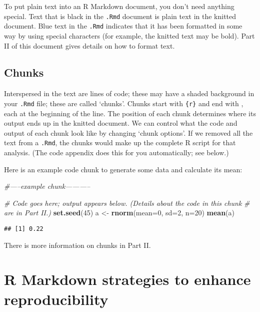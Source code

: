 \documentclass[
]{article}
\newenvironment{Shaded}{\begin{snugshade}}{\end{snugshade}}
\newcommand{\CommentTok}[1]{\textcolor[rgb]{0.56,0.35,0.01}{\textit{#1}}}
\newcommand{\DataTypeTok}[1]{\textcolor[rgb]{0.13,0.29,0.53}{#1}}
\newcommand{\DecValTok}[1]{\textcolor[rgb]{0.00,0.00,0.81}{#1}}
\newcommand{\KeywordTok}[1]{\textcolor[rgb]{0.13,0.29,0.53}{\textbf{#1}}}
\newcommand{\NormalTok}[1]{#1}
\newcommand{\StringTok}[1]{\textcolor[rgb]{0.31,0.60,0.02}{#1}}
\begin{document}
To put plain text into an R Markdown document, you don't need anything
special. Text that is black in the \texttt{.Rmd} document is plain text
in the knitted document. Blue text in the \texttt{.Rmd} indicates that
it has been formatted in some way by using special characters (for
example, the knitted text may be bold). Part II of this document gives
details on how to format text.

\hypertarget{chunks}{%
\subsection{Chunks}\label{chunks}}

Interspersed in the text are lines of code; these may have a shaded
background in your \texttt{.Rmd} file; these are called `chunks'. Chunks
start with
\texttt{\textasciigrave{}\textasciigrave{}\textasciigrave{}\{r\}} and
end with \texttt{\textasciigrave{}\textasciigrave{}\textasciigrave{}},
each at the beginning of the line. The position of each chunk determines
where its output ends up in the knitted document. We can control what
the code and output of each chunk look like by changing `chunk options'.
If we removed all the text from a \texttt{.Rmd}, the chunks would make
up the complete R script for that analysis. (The code appendix does this
for you automatically; see below.)

Here is an example code chunk to generate some data and calculate its
mean:

\begin{Shaded}
\begin{Highlighting}[]
\CommentTok{#-----example chunk-----------}

\CommentTok{# Code goes here; output appears below.  (Details about the code in this chunk}
\CommentTok{# are in Part II.)}
\KeywordTok{set.seed}\NormalTok{(}\DecValTok{45}\NormalTok{)}
\NormalTok{a <-}\StringTok{ }\KeywordTok{rnorm}\NormalTok{(}\DataTypeTok{mean=}\DecValTok{0}\NormalTok{, }\DataTypeTok{sd=}\DecValTok{2}\NormalTok{, }\DataTypeTok{n=}\DecValTok{20}\NormalTok{)}
\KeywordTok{mean}\NormalTok{(a)}
\end{Highlighting}
\end{Shaded}

\begin{verbatim}
## [1] 0.22
\end{verbatim}

There is more information on chunks in Part II.

\hypertarget{r-markdown-strategies-to-enhance-reproducibility}{%
\section{R Markdown strategies to enhance
reproducibility}\label{r-markdown-strategies-to-enhance-reproducibility}}
\end{document}
